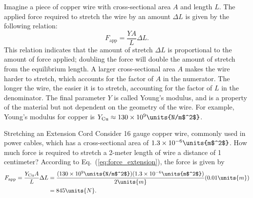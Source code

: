 Imagine a piece of copper wire with cross-sectional area $A$ and
length $L$.  The applied force required to stretch the wire by an amount
$\Delta L$ is given by the following relation:
\begin{equation}
F_\text{app} = \frac{Y A}{L}\Delta L.
\label{eq:force_extension}
\end{equation}
This relation indicates that the amount of stretch $\Delta L$ is
proportional to the amount of force applied; doubling the force will
double the amount of stretch from the equilibrium length.  A larger
cross-sectional area $A$ makes the wire harder to stretch, which
accounts for the factor of $A$ in the numerator.  The longer the wire,
the easier it is to stretch, accounting for the factor of $L$ in the
denominator.  The final parameter $Y$ is called Young's modulus,
and is a property of the material but not dependent on the geometry
of the wire.  For example, Young's modulus for copper is
$Y_\text{Cu} \approx 130\times 10^9 \units{N/m$^2$}$.  

\begin{example}{Stretching an Extension Cord}
Consider 16 gauge copper wire, commonly used in power cables, which 
has a
cross-sectional area of $1.3\times 10^{-6}\units{m$^2$}$.  How much
force is required to stretch a 2-meter length of wire a distance of
1 centimeter?
\solution
According to Eq.~(\ref{eq:force_extension}), the force is given by
\begin{align}
 F_\text{app} = \frac{Y_\text{Cu}A}{L}\Delta L &=
 \displaystyle\frac{(130\times 10^9\units{N/m$^2$})(1.3\times
  10^{-6}\units{m$^2$})} {2\units{m}} (0.01\units{m}) \nonumber\\
 &= 845\units{N}.
\end{align}
\end{example} 

